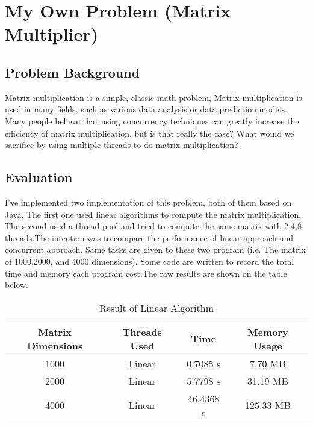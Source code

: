 \documentclass[a4paper,10pt]{article}
\begin{document}
\section{My Own Problem (Matrix Multiplier)}
\subsection{Problem Background}
Matrix multiplication is a simple, classic math problem, Matrix multiplication is used in many fields, such as various data analysis or data prediction models. Many people believe that using concurrency techniques can greatly increase the efficiency of matrix multiplication, but is that really the case? What would we sacrifice by using multiple threads to do matrix multiplication?

\subsection{Evaluation}
I've implemented two implementation of this problem, both of them based on Java. The first one used linear algorithms to compute the matrix multiplication. The second used a thread pool and tried to compute the same matrix with 2,4,8 threads.The intention was to compare the performance of linear approach and concurrent approach.
Same tasks are given to these two program (i.e. The matrix of 1000,2000, and 4000 dimensions). Some code are written to record the total time and memory each program cost.The raw results are shown on the table below.

\begin{table}[h]
    \centering
    \begin{tabular}{|c|c|c|c|}
    \hline
       \textbf{Matrix Dimensions}&  \textbf{Threads Used} & \textbf{Time}& \textbf{Memory Usage} \\\hline
          1000&    Linear&  0.7085 s &  7.70 MB\\\hline
          2000&    Linear&  5.7798 s  & 31.19 MB \\\hline
        4000&   Linear&   46.4368 s& 125.33 MB \\\hline

    \end{tabular}
    \caption{Result of Linear Algorithm}
\end{table}
\end{document}
